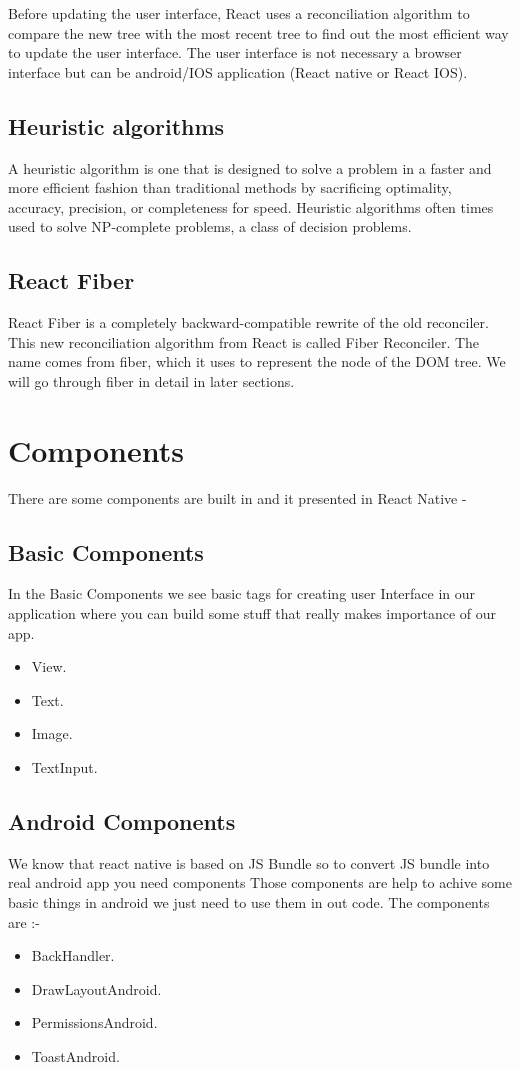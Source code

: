 \documentclass[12pt,a4paper]{report}
\begin{document}
Before updating the user interface, React uses a reconciliation algorithm to compare the new tree with the most recent tree to find out the most efficient way to update the user interface. The user interface is not necessary a browser interface but can be android/IOS application (React native or React IOS).

\subsection{Heuristic algorithms}
A heuristic algorithm is one that is designed to solve a problem in a faster and more efficient fashion than traditional methods by sacrificing optimality, accuracy, precision, or completeness for speed. Heuristic algorithms often times used to solve NP-complete problems, a class of decision problems.

\subsection{React Fiber}
React Fiber is a completely backward-compatible rewrite of the old reconciler. This new reconciliation algorithm from React is called Fiber Reconciler. The name comes from fiber, which it uses to represent the node of the DOM tree. We will go through fiber in detail in later sections.

\newpage

\section{Components}
There are some components are built in and it presented in React Native -
\subsection{Basic Components}
In the Basic Components we see basic tags for creating user Interface in our application where you can build some stuff that really makes importance of our app.
\begin{itemize}
  \item View.
  \item Text.
  \item Image.
  \item TextInput.
\end{itemize}

\subsection{Android Components}
We know that react native is based on JS Bundle so to convert JS bundle into real android app you need components Those components are help to achive some basic things in android  we just need to use them in out code. The components are  :- 
\\
\begin{itemize}
  \item BackHandler.
  \item DrawLayoutAndroid.
  \item PermissionsAndroid.
  \item ToastAndroid.
\end{itemize}
\end{document}
